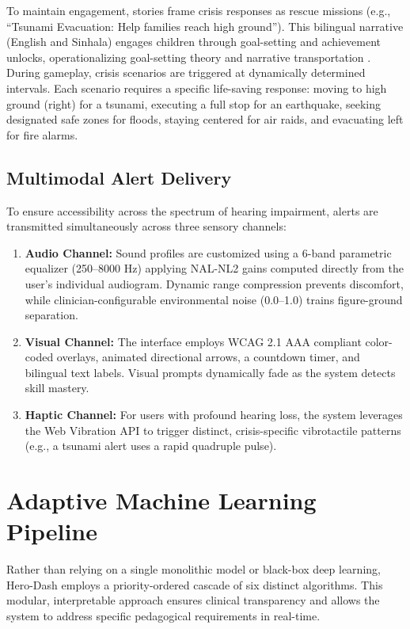 \documentclass[conference]{IEEEtran}
\begin{document}
To maintain engagement, stories frame crisis responses as rescue missions (e.g., ``Tsunami Evacuation: Help families reach high ground''). This bilingual narrative (English and Sinhala) engages children through goal-setting and achievement unlocks, operationalizing goal-setting theory \cite{b8} and narrative transportation \cite{b9}. During gameplay, crisis scenarios are triggered at dynamically determined intervals. Each scenario requires a specific life-saving response: moving to high ground (right) for a tsunami, executing a full stop for an earthquake, seeking designated safe zones for floods, staying centered for air raids, and evacuating left for fire alarms.

\subsection{Multimodal Alert Delivery}
To ensure accessibility across the spectrum of hearing impairment, alerts are transmitted simultaneously across three sensory channels:

\begin{enumerate}
    \item \textbf{Audio Channel:} Sound profiles are customized using a 6-band parametric equalizer (250--8000 Hz) applying NAL-NL2 gains computed directly from the user's individual audiogram. Dynamic range compression prevents discomfort, while clinician-configurable environmental noise (0.0--1.0) trains figure-ground separation.
    \item \textbf{Visual Channel:} The interface employs WCAG 2.1 AAA compliant color-coded overlays, animated directional arrows, a countdown timer, and bilingual text labels. Visual prompts dynamically fade as the system detects skill mastery.
    \item \textbf{Haptic Channel:} For users with profound hearing loss, the system leverages the Web Vibration API to trigger distinct, crisis-specific vibrotactile patterns (e.g., a tsunami alert uses a rapid quadruple pulse).
\end{enumerate}

\section{Adaptive Machine Learning Pipeline}

Rather than relying on a single monolithic model or black-box deep learning, Hero-Dash employs a priority-ordered cascade of six distinct algorithms. This modular, interpretable approach ensures clinical transparency and allows the system to address specific pedagogical requirements in real-time.
\end{document}
